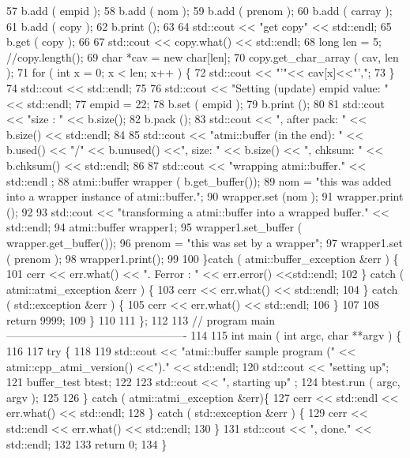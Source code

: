 \begin{DoxyCodeInclude}
57         b.add ( empid );
58         b.add ( nom );
59         b.add ( prenom );
60         b.add ( carray );
61         b.add ( copy );
62         b.print ();
63 
64         std::cout << "get copy" << std::endl;
65         b.get ( copy );
66 
67         std::cout << copy.what() << std::endl;
68         long len = 5;                  //copy.length();
69         char *cav = new char[len];
70         copy.get\_char\_array ( cav, len );
71         for ( int x = 0; x < len; x++ ) \{
72           std::cout << "'"<< cav[x]<<"',";
73         \}
74         std::cout << std::endl;
75 
76         std::cout << "Setting (update) empid value: " << std::endl;
77         empid = 22;
78         b.set ( empid );
79         b.print ();
80 
81         std::cout << "size : " << b.size();
82         b.pack ();
83         std::cout << ", after pack: " << b.size() << std::endl;
84 
85         std::cout << "atmi::buffer (in the end): " << b.used() << "/" << b.unused() <<", size: " <<
       b.size() << ", chksum: " << b.chksum() <<  std::endl;
86 
87         std::cout << "wrapping atmi::buffer." << std::endl ;
88         atmi::buffer wrapper ( b.get\_buffer());
89         nom = "this was added into a wrapper instance of atmi::buffer.";
90         wrapper.set (nom );
91         wrapper.print ();
92 
93         std::cout << "transforming a atmi::buffer into a wrapped buffer." << std::endl;
94         atmi::buffer wrapper1;
95         wrapper1.set\_buffer ( wrapper.get\_buffer());
96         prenom = "this was set by a wrapper";
97         wrapper1.set ( prenom );
98         wrapper1.print();
99 
100       \}catch ( atmi::buffer\_exception &err ) \{
101         cerr << err.what() << ". Ferror : " << err.error() <<std::endl;
102       \} catch ( atmi::atmi\_exception &err ) \{
103         cerr << err.what() << std::endl;
104       \} catch ( std::exception &err ) \{
105         cerr << err.what() << std::endl;
106       \}
107 
108       return 9999;
109     \}
110 
111 \};
112 
113 // program main -------------------------------------------------
114 
115 int main ( int argc, char **argv ) \{
116 
117   try \{
118 
119     std::cout << "atmi::buffer sample program (" << atmi::cpp\_atmi\_version() <<")." << std::endl;
120     std::cout << "setting up";
121     buffer\_test btest;
122 
123     std::cout << ", starting up" ;
124     btest.run ( argc, argv );
125 
126   \} catch ( atmi::atmi\_exception &err)\{
127     cerr << std::endl << err.what() << std::endl;
128   \} catch ( std::exception &err ) \{
129     cerr << std::endl << err.what() << std::endl;
130   \}
131   std::cout << ", done." << std::endl;
132 
133   return 0;
134 \}
\end{DoxyCodeInclude}
 